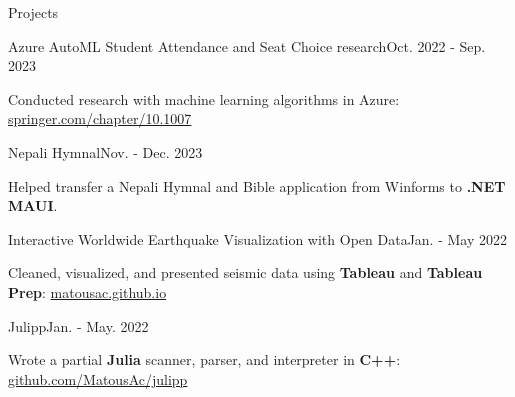 \begin{rSection}{Projects}
  \begin{project}{Azure AutoML Student Attendance and Seat Choice research}{Oct. 2022 - Sep. 2023}
    \item Conducted research with machine learning algorithms in Azure: \href{https://link.springer.com/chapter/10.1007/978-3-031-47721-8_42}{springer.com/chapter/10.1007}
  \end{project}
  \begin{project}{Nepali Hymnal}{Nov. - Dec. 2023}
    \item Helped transfer a Nepali Hymnal and Bible application from Winforms to {\bf .NET} {\bf MAUI}.
  \end{project}
  \begin{project}{Interactive Worldwide Earthquake Visualization with Open Data}{Jan. - May 2022}
    \item Cleaned, visualized, and presented seismic data using {\bf Tableau} and {\bf Tableau Prep}: \href{https://matousac.github.io/}{matousac.github.io}
  \end{project}
  \begin{project}{Julipp}{Jan. - May. 2022}
    \item Wrote a partial {\bf Julia} scanner, parser, and interpreter in {\bf C++}: \href{https://github.com/MatousAc/julipp}{github.com/MatousAc/julipp}
  \end{project}
\end{rSection}